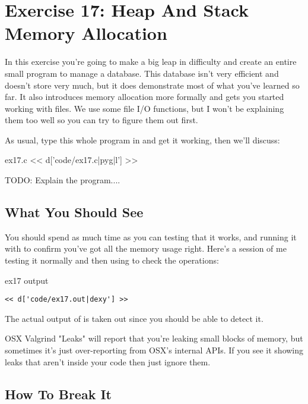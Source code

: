 \chapter{Exercise 17: Heap And Stack Memory Allocation}

In this exercise you're going to make a big leap in difficulty and create
an entire small program to manage a database.  This database isn't very
efficient and doesn't store very much, but it does demonstrate most of
what you've learned so far.  It also introduces memory allocation more
formally and gets you started working with files.  We use some file I/O
functions, but I won't be explaining them too well so you can try to
figure them out first.

As usual, type this whole program in and get it working, then we'll discuss:

\begin{code}{ex17.c}
<< d['code/ex17.c|pyg|l'] >>
\end{code}

TODO: Explain the program....

\section{What You Should See}

You should spend as much time as you can testing that it works, and running
it with  to confirm you've got all the memory usage
right.  Here's a session of me testing it normally and then using
 to check the operations:

\begin{code}{ex17 output}
\begin{lstlisting}
<< d['code/ex17.out|dexy'] >>
\end{lstlisting}
\end{code}

The actual output of  is taken out since you should
be able to detect it.

\begin{aside}{OSX Valgrind "Leaks"}
 will report that you're leaking small blocks of memory,
but sometimes it's just over-reporting from OSX's internal APIs.  If you see it
showing leaks that aren't inside your code then just ignore them.
\end{aside}

\section{How To Break It}

